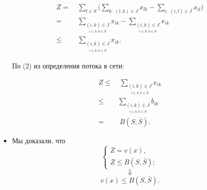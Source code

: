\begin{itemize}[nosep]
	\begin{align*}
		Z =& \; \sum_{l \in S} \bigg(\sum_{k:\;(l, k) \in J} x_{lk} - \sum_{i: \; (i, l) \in J} x_{il}\bigg) \\
		=& \;  \sum_{\underset{i \in S, k \in \bar{S}}{(i, k) \in J}} x_{ik} - \sum_{\underset{i \in \bar{S}, k \in S}{(i, k) \in J}} x_{ik} \\
		\le& \; \sum_{\underset{i \in S, k \in \bar{S}}{(i, k) \in J}} x_{ik}.
	\end{align*}
	
	По (2) из определения потока в сети:
	
	\begin{align*}
		Z \le& \; \sum_{\underset{i \in S, k \in \bar{S}}{(i, k) \in J}} x_{ik} \\
		\le& \sum_{\underset{i \in S, k \in \bar{S}}{(i, k) \in J}} b_{ik} \\
		=& \; B(S, \bar{S}).
	\end{align*}
	
	\item[\fbox{3}] Мы доказали, что
	\[
	\begin{cases}
		Z = v(x), \\
		Z \le B(S, \bar{S}); 
	\end{cases}
	\]
	\[
	\Downarrow
	\]
	\[
	v(x) \le B(S, \bar{S}).
	\]
\end{itemize}
